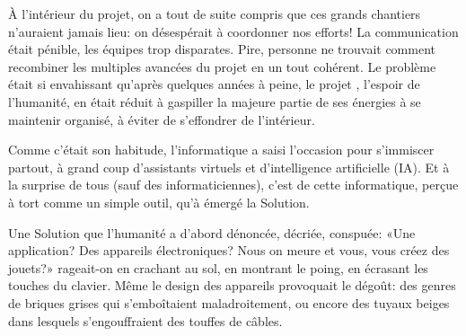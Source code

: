À l'intérieur du projet, on a tout de suite compris que ces grands chantiers
n'auraient jamais lieu: on désespérait à coordonner nos efforts! La
communication était pénible, les équipes trop disparates. Pire, personne ne
trouvait comment recombiner les multiples avancées du projet en un tout
cohérent.  Le problème était si envahissant qu'après quelques années à peine,
le projet \nomProjet{}, l'espoir de l'humanité, en était réduit à gaspiller la
majeure partie de ses énergies à se maintenir organisé, à éviter de s'effondrer
de l'intérieur.  

Comme c'était son habitude, l'informatique a saisi l'occasion
pour s'immiscer partout, à grand coup d'assistants virtuels et d'intelligence
artificielle (IA).  Et à la surprise de tous (sauf des informati\-ciennes),
c'est de cette informatique, perçue à tort comme un simple outil, qu'à
émergé la Solution.

Une Solution que l'humanité a d'abord dénoncée, décriée, conspuée: «Une
application? Des appareils électroniques? Nous on meure et vous, vous créez des
jouets?» rageait-on en crachant au sol, en montrant le poing, en écrasant
les touches du clavier.  Même le design des appareils provoquait le
dégoût: des genres de briques grises qui s'emboîtaient mala\-droi\-tement, ou
encore des tuyaux beiges dans lesquels s'engouffraient des touffes
de câbles.

